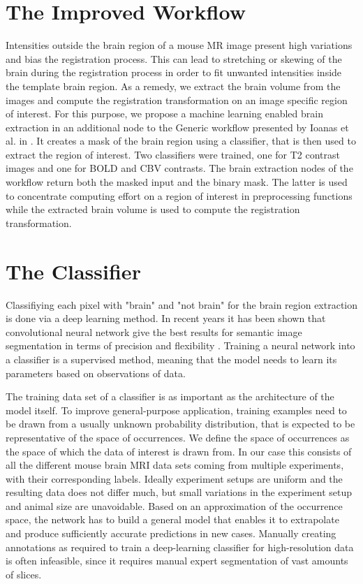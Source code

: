 \section{The Improved Workflow}

Intensities outside the brain region of a mouse MR image present high variations and bias the registration process.
This can lead to stretching or skewing of the brain during the registration process in order to fit unwanted intensities inside the template brain region.
As a remedy, we extract the brain volume from the images and compute the registration transformation on an image specific region of interest.
For this purpose, we propose a machine learning enabled brain extraction in an additional node to the Generic workflow presented by Ioanas et al. in \cite{ioanas_optimized_2019}.
It creates a mask of the brain region using a classifier, that is then used to extract the region of interest.
Two classifiers were trained, one for T2 contrast images and one for BOLD \cite{bold} and CBV \cite{cbv} contrasts.
The brain extraction nodes of the workflow return both the masked input and the binary mask.
The latter is used to concentrate computing effort on a region of interest in preprocessing functions while the extracted brain volume is used to compute the registration transformation.

\section{The Classifier} \label{sec:Convolutional Neural Networks}
Classifiying each pixel with "brain" and "not brain" for the brain region extraction is done via a deep learning method.
In recent years it has been shown that convolutional neural network give the best results for semantic image segmentation in terms of precision and flexibility \cite{geng_survey_2018, ronneberger_u-net:_2015}.
Training a neural network into a classifier is a supervised method, meaning that the model needs to learn its parameters based on observations of data.

The training data set of a classifier is as important as the architecture of the model itself.
To improve general-purpose application, training examples need to be drawn from a usually unknown probability distribution, that is expected to be representative of the space of occurrences.
We define the space of occurrences as the space of which the data of interest is drawn from.
In our case this consists of all the different mouse brain MRI data sets coming from multiple experiments, with their corresponding labels.
Ideally experiment setups are uniform and the resulting data does not differ much, but small variations in the experiment setup and animal size are unavoidable.
Based on an approximation of the occurrence space, the network has to build a general model that enables it to extrapolate and produce sufficiently accurate predictions in new cases.
Manually creating annotations as required to train a deep-learning classifier for high-resolution data is often infeasible, since it requires manual expert segmentation of vast amounts of slices.

